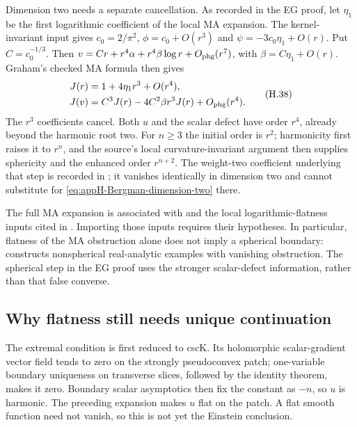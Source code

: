 Dimension two needs a separate cancellation. As recorded in the
EG proof, let $\eta_1$ be the first logarithmic coefficient of
the local MA expansion. The kernel-invariant input gives
$c_0=2/\pi^2$,
$\phi=c_0+O(r^3)$ and $\psi=-3c_0\eta_1+O(r)$. Put $C=c_0^{-1/3}$. Then
$v=Cr+r^4\alpha+r^4\beta\log r+O_{\rm phg}(r^7)$, with
$\beta=C\eta_1+O(r)$. Graham's checked MA formula
\cite[equation~(4.11)]{Graham87HigherAsymptoticsPublished}
then gives
\begin{equation*}
 \begin{aligned}
 J(r)&=1+4\eta_1r^3+O(r^4),\\
 J(v)&=C^3J(r)-4C^2\beta r^3J(r)+O_{\rm phg}(r^4).
 \end{aligned}
 \tag{H.38}\label{eq:appH-Bergman-dimension-two}
\end{equation*}
The $r^3$ coefficients cancel. Both $u$ and the scalar defect
have order $r^4$, already beyond the harmonic root two.
For $n\geq3$ the initial order is $r^2$; harmonicity first raises
it to $r^n$, and the source's local curvature-invariant argument
then supplies sphericity and the enhanced order $r^{n+2}$.
The weight-two coefficient underlying that step is recorded in
\cite[Proposition~2.1]{HuangXiao21BergmanPublished}; it vanishes
identically in dimension two and cannot substitute for
\eqref{eq:appH-Bergman-dimension-two} there.

The full MA expansion is associated with
\cite[Theorem~8.18]{LeeMelrose82BoundaryPublished} and the
local logarithmic-flatness inputs cited in
\cite{EbenfeltXiao24LogarithmicFlatness}. Importing those inputs
requires their hypotheses. In particular, flatness of the MA
obstruction alone does not imply a spherical boundary:
\cite[Proposition~4.14]{Graham87HigherAsymptoticsPublished}
constructs nonspherical real-analytic examples with vanishing
obstruction. The spherical step in the EG proof uses the stronger
scalar-defect information, rather than that false converse.

\subsection{Why flatness still needs unique continuation}
\label{sec:appH-Bergman-Carleman}

The extremal condition is first reduced to cscK. Its holomorphic
scalar-gradient vector field tends to zero on the strongly
pseudoconvex patch; one-variable boundary uniqueness on transverse
slices, followed by the identity theorem, makes it zero. Boundary
scalar asymptotics then fix the constant as $-n$, so $u$ is harmonic.
The preceding expansion makes $u$ flat on the patch. A flat smooth
function need not vanish, so this is not yet the Einstein conclusion.

